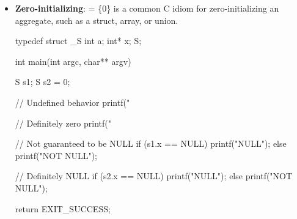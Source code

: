 \documentclass{report}
\begin{document}
\begin{itemize}
                \begin{cppcode}
                    S s = {1,2,3};
                \end{cppcode}
                \bigbreak \noindent 
                If we omit some members in an aggregate initializer list, C initializes the omitted members as if they had static storage duration.
            \item \textbf{Zero-initializing}: = \{0\} is a common C idiom for zero-initializing an aggregate, such as a struct, array, or union.
                \bigbreak \noindent 
                \begin{cppcode}
                    typedef struct _S {
                        int a;
                        int* x;
                    } S;


                    int main(int argc, char** argv) {

                        S s1;
                        S s2 = {0};

                        // Undefined behavior
                        printf("%

                        // Definitely zero
                        printf("%

                        // Not guaranteed to be NULL
                        if (s1.x == NULL) {
                            printf("NULL\n");
                        } else printf("NOT NULL\n");

                        // Definitely NULL
                        if (s2.x == NULL) {
                            printf("NULL\n");
                        } else printf("NOT NULL\n");


                        return EXIT_SUCCESS;
                    }
                \end{cppcode}

        \end{itemize}
\end{document}
